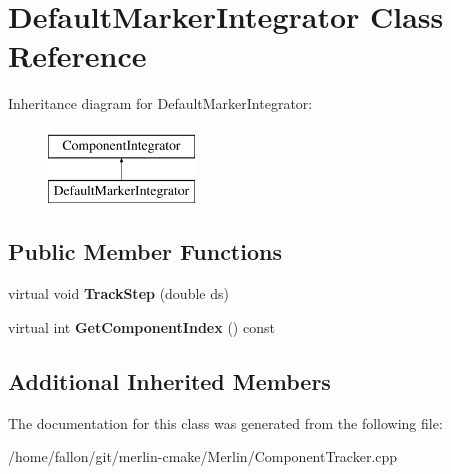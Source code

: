 \hypertarget{classDefaultMarkerIntegrator}{}\section{Default\+Marker\+Integrator Class Reference}
\label{classDefaultMarkerIntegrator}
Inheritance diagram for Default\+Marker\+Integrator\+:\begin{figure}[H]
\begin{center}
\leavevmode
\includegraphics[height=2.000000cm]{classDefaultMarkerIntegrator}
\end{center}
\end{figure}
\subsection*{Public Member Functions}
\begin{DoxyCompactItemize}
\item 
\mbox{\label{classDefaultMarkerIntegrator_a8b9a6a8fead23f02fa0996240ff63052}} 
virtual void {\bfseries Track\+Step} (double ds)
\item 
\mbox{\label{classDefaultMarkerIntegrator_a2e9df0ac86d3f001fafb89766ac594f7}} 
virtual int {\bfseries Get\+Component\+Index} () const
\end{DoxyCompactItemize}
\subsection*{Additional Inherited Members}


The documentation for this class was generated from the following file\+:\begin{DoxyCompactItemize}
\item 
/home/fallon/git/merlin-\/cmake/\+Merlin/Component\+Tracker.\+cpp\end{DoxyCompactItemize}
